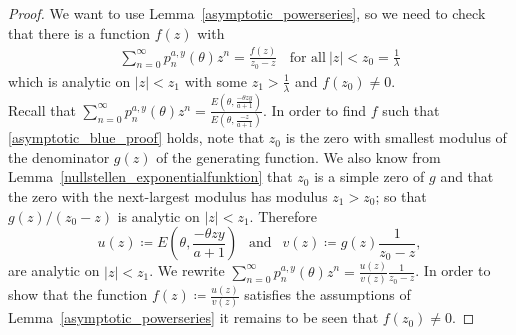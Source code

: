 \documentclass[12pt]{article}
\renewcommand{\P}{\mathbb{P}} %
\newcommand{\1}{\mathds{1}}
\theoremstyle{definition}
\theoremstyle{plain}
\theoremstyle{remark}
\begin{document}
    \begin{proof} 
   We want to use Lemma~\ref{asymptotic_powerseries}, so we need to check that there is a function $f(z)$ with
    \begin{align}\label{asymptotic_blue_proof}
        \sum_{n=0}^{\infty}p_n^{a,y}(\theta)z^n=\frac{f(z)}{z_0-z}~~~~\text{for all}~|z|<z_0=\frac{1}{\lambda}
    \end{align}
   which is analytic on $|z|<z_1$ with some $z_1>\frac{1}{\lambda}$ and $f\left(z_0\right)\neq 0$.
   \\Recall that  $\sum_{n=0}^{\infty}p_n^{a,y}(\theta)z^n=\frac{E\left(\theta,\frac{-\theta zy}{a+1}\right)}{E\left(\theta,\frac{-z}{a+1}\right)}$. In order to find $f$ such that \eqref{asymptotic_blue_proof} holds, note that $z_0$ is the zero with smallest modulus of the denominator $g(z)$ of the generating function. We also know from Lemma~\ref{nullstellen_exponentialfunktion} that $z_0$ is a simple zero of $g$ and that the zero with the next-largest modulus has modulus $z_1>z_0$; so that $g(z)/(z_0-z)$ is analytic on $|z|<z_1$. Therefore $$u(z)\coloneqq E\left(\theta,\frac{-\theta zy}{a+1}\right)~~\text{ and }~~v(z)\coloneqq g(z)\frac{1}{z_0-z},$$ are analytic on $|z|<z_1$. We rewrite $\sum_{n=0}^{\infty}p_n^{a,y}(\theta)z^n=\frac{u(z)}{v(z)}\frac{1}{z_0-z}$. In order to show that the function $f(z)\coloneqq\frac{u(z)}{v(z)}$ satisfies the assumptions of Lemma~\ref{asymptotic_powerseries} it remains to be seen that $f(z_0)\neq 0$.

\end{proof}
\end{document}
